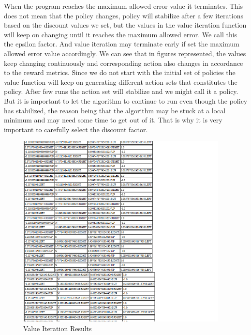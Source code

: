 When the program reaches the maximum allowed error value it terminates. This
does not mean that the policy changes, policy will stabilize after a few
iterations based on the discount values we set, but the values in the value
iteration function will keep on changing until it reaches the maximum allowed
error. We call this the epsilon factor. And value iteration may terminate early
if set the maximum allowed error value accordingly.  We can see that in figures
represented, the values keep changing continuously and corresponding action also
changes in accordance to the reward metrics. Since we do not start with the
initial set of policies the value function will keep on generating different
action sets that constitutes the policy. After few runs the action set will
stabilize and we might call it a policy. But it is important to let the
algorithm to continue to run even though the policy has stabilized, the reason
being that the algorithm may be stuck at a local minimum and may need some time
to get out of it.  That is why it is very important to carefully select the
discount factor.

\begin{figure}[hb]
    \label{fig:ValueIterationResults2}
    \begin{center}
        \includegraphics[width=0.95\textwidth]{Figures/Planning_Figure_3.png}
        \caption{Value Iteration Results}
    \end{center}
\end{figure}

